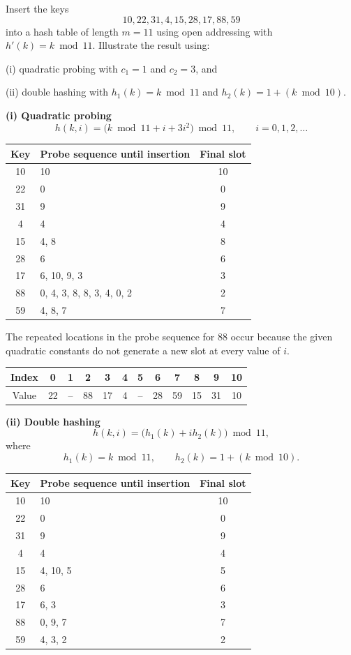 \documentclass[11pt,a4paper]{article}
\begin{document}
\begin{qaquestion}
Insert the keys
\[
10,22,31,4,15,28,17,88,59
\]
into a hash table of length \(m=11\) using open addressing with \(h'(k)=k\bmod 11\). Illustrate the result using:

(i) quadratic probing with \(c_1=1\) and \(c_2=3\), and

(ii) double hashing with \(h_1(k)=k\bmod 11\) and \(h_2(k)=1+(k\bmod 10)\).
\end{qaquestion}
\begin{qaanswer}[Answer 1(b)]
\textbf{(i) Quadratic probing}
\[
h(k,i)=\bigl(k\bmod 11+i+3i^2\bigr)\bmod 11,\qquad i=0,1,2,\ldots
\]

\begin{center}
\small
\begin{tabular}{c l c}
\toprule
Key & Probe sequence until insertion & Final slot\\
\midrule
10 & 10 & 10\\
22 & 0 & 0\\
31 & 9 & 9\\
4  & 4 & 4\\
15 & 4, 8 & 8\\
28 & 6 & 6\\
17 & 6, 10, 9, 3 & 3\\
88 & 0, 4, 3, 8, 8, 3, 4, 0, 2 & 2\\
59 & 4, 8, 7 & 7\\
\bottomrule
\end{tabular}
\end{center}

The repeated locations in the probe sequence for 88 occur because the given quadratic constants do not generate a new slot at every value of \(i\).

\begin{center}
\begin{tabular}{c|ccccccccccc}
Index &0&1&2&3&4&5&6&7&8&9&10\\\hline
Value &22&--&88&17&4&--&28&59&15&31&10
\end{tabular}
\end{center}

\textbf{(ii) Double hashing}
\[
h(k,i)=\bigl(h_1(k)+i h_2(k)\bigr)\bmod 11,
\]
where
\[
h_1(k)=k\bmod 11,\qquad h_2(k)=1+(k\bmod 10).
\]

\begin{center}
\small
\begin{tabular}{c l c}
\toprule
Key & Probe sequence until insertion & Final slot\\
\midrule
10 & 10 & 10\\
22 & 0 & 0\\
31 & 9 & 9\\
4  & 4 & 4\\
15 & 4, 10, 5 & 5\\
28 & 6 & 6\\
17 & 6, 3 & 3\\
88 & 0, 9, 7 & 7\\
59 & 4, 3, 2 & 2\\
\bottomrule
\end{tabular}
\end{center}


\end{qaanswer}
\end{document}
